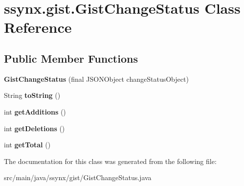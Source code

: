 \hypertarget{classssynx_1_1gist_1_1GistChangeStatus}{}\section{ssynx.\+gist.\+Gist\+Change\+Status Class Reference}
\label{classssynx_1_1gist_1_1GistChangeStatus}
\subsection*{Public Member Functions}
\begin{DoxyCompactItemize}
\item 
\mbox{\label{classssynx_1_1gist_1_1GistChangeStatus_a9ef296d00e6acaa63e354cd2ca2ea850}} 
{\bfseries Gist\+Change\+Status} (final J\+S\+O\+N\+Object change\+Status\+Object)
\item 
\mbox{\label{classssynx_1_1gist_1_1GistChangeStatus_a6e2a3afdaecba5f729659f9ecb7eb219}} 
String {\bfseries to\+String} ()
\item 
\mbox{\label{classssynx_1_1gist_1_1GistChangeStatus_a77065f4aa31c850adee747ed19279868}} 
int {\bfseries get\+Additions} ()
\item 
\mbox{\label{classssynx_1_1gist_1_1GistChangeStatus_a2f241b457ff894525ab2fc47ffaf4bcc}} 
int {\bfseries get\+Deletions} ()
\item 
\mbox{\label{classssynx_1_1gist_1_1GistChangeStatus_afa00a0b2d8ec61ab999c7dd71dc0e640}} 
int {\bfseries get\+Total} ()
\end{DoxyCompactItemize}


The documentation for this class was generated from the following file\+:\begin{DoxyCompactItemize}
\item 
src/main/java/ssynx/gist/Gist\+Change\+Status.\+java\end{DoxyCompactItemize}
